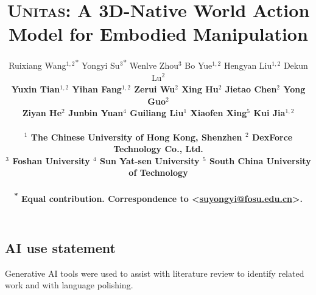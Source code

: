 \documentclass{article}
\title{\textsc{Unitas}: A 3D-Native World Action Model for Embodied Manipulation}
\author{Ruixiang Wang$^{1,2}$\textsuperscript{*} \quad Yongyi Su$^{3}$\textsuperscript{*\textdagger} \quad Wenlve Zhou$^{3}$ \quad Bo Yue$^{1,2}$ \quad Hengyan Liu$^{1,2}$ \quad Dekun Lu$^{2}$ \\
\bf Yuxin Tian$^{1,2}$ \quad Yihan Fang$^{1,2}$ \quad Zerui Wu$^{2}$ \quad Xing Hu$^{2}$ \quad Jietao Chen$^{2}$ \quad Yong Guo$^{2}$ \\
\bf Ziyan He$^{2}$ \quad Junbin Yuan$^{4}$ \quad Guiliang Liu$^{1}$ \quad Xiaofen Xing$^{5}$ \quad Kui Jia$^{1,2}$\\
\\
$^1$ The Chinese University of Hong Kong, Shenzhen \quad
$^2$ DexForce Technology Co., Ltd.\\
$^3$ Foshan University\quad
$^4$ Sun Yat-sen University \quad
$^5$ South China University of Technology\\
\\
\textsuperscript{*} Equal contribution. \quad
\textsuperscript{\textdagger} Correspondence to \textless\href{mailto:suyongyi@fosu.edu.cn}{suyongyi@fosu.edu.cn}\textgreater.
}
\begin{document}
\maketitle










\subsection*{AI use statement}
Generative AI tools were used to assist with literature review to identify related work and with language polishing.




\clearpage
\appendix

\end{document}
